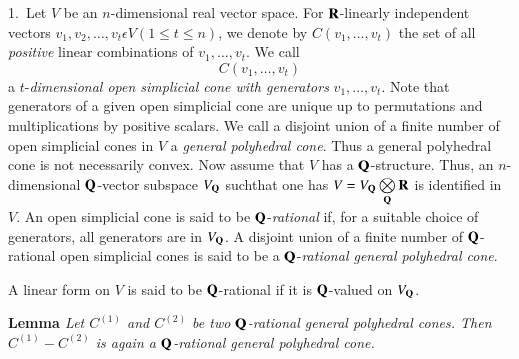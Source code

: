 1.~Let $V$ be an $n$-dimensional real vector space. For $\mathbf{R}$-linearly independent vectors $v_1, v_2, \ldots, v_t \epsilon V (1 \leqslant t \leqslant n)$, we denote by $C (v_1, \ldots, v_t )$  the set of all \textit{positive} linear combinations of $v_1, \ldots, v_t$. We call 
$$
C(v_1, \ldots, v_t)
$$ 
a $t$-\textit{dimensional open simplicial cone with generators} $v_1, \ldots, v_t$. Note that generators of a given open simplicial cone are unique up to permutations and multiplications by positive scalars. We call a disjoint union of a finite number of open simplicial cones in $V$ a \textit{general polyhedral cone}. Thus a general polyhedral cone is not necessarily convex. Now assume that $V$ has a $\mathbf{Q}$-structure. Thus, an $n$-dimensional $\mathbf{Q}$-vector subspace $V_{\mathbf{Q}}$ such\pageoriginale that one has $V = V_{\mathbf{Q}} \bigotimes\limits_{\mathbf{Q}} \mathbf{R}$ is identified in $V$. An open simplicial cone is said to be $\mathbf{Q}$-\textit{rational} if, for a suitable choice of generators, all generators are in $V_{\mathbf{Q}}$. A disjoint union of a finite number of $\mathbf{Q}$-rational open simplicial cones is said to be a $\mathbf{Q}$-\textit{rational general polyhedral cone}.

A linear form on $V$ is said to be $\mathbf{Q}$-rational if it is $\mathbf{Q}$-valued on $V_{\mathbf{Q}}$.

\medskip
\noindent
{\bfseries Lemma \label{art8-lem1}}
\textit{Let $C^{(1)}$ and $C^{(2)}$ be two $\mathbf{Q}$-rational general polyhedral cones. Then $C^{(1)} - C^{(2)}$ is again a $\mathbf{Q}$-rational general polyhedral cone.}

